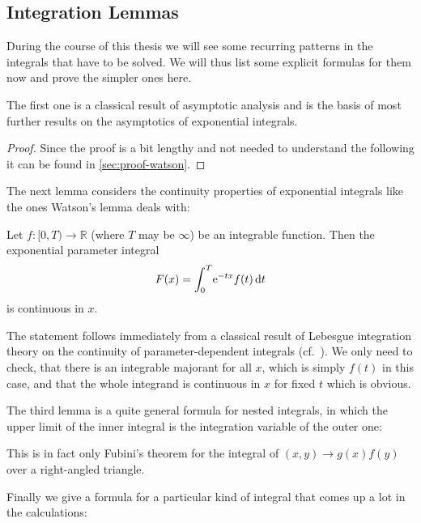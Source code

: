 \subsection{Integration Lemmas}
During the course of this thesis we will see some recurring patterns in the
integrals that have to be solved. We will thus list some explicit formulas for
them now and prove the simpler ones here.

The first one is a classical result of asymptotic analysis and is the basis of
most further results on the asymptotics of exponential integrals.
\begin{Lemma}
  
  \begin{proof}
    Since the proof is a bit lengthy and not needed to understand the following
    it can be found in \cref{sec:proof-watson}.
  \end{proof}
\end{Lemma}
The next lemma considers the continuity properties of exponential integrals like
the ones Watson's lemma deals with:
\begin{Lemma}
  \label{lem:continuity_of_watson_integrals}
  Let $f\colon [0,T)\to\mathbb{R}$ (where $T$ may be $\infty$) be an integrable
  function. Then the exponential parameter integral
  \begin{equation*}
    F(x) = \Integ[T]{0}{t}{\Eto{-tx} f(t)}
  \end{equation*}
  is continuous in $x$.
  \begin{Proof}
    The statement follows immediately from a classical result of Lebesgue
    integration theory on the continuity of parameter-dependent integrals
    (cf.\ \cite[p282f]{Konigsberger2004}). We only need to check, that there is
    an integrable majorant for all $x$, which is simply $f(t)$ in this case, and
    that the whole integrand is continuous in $x$ for fixed $t$ which is
    obvious.
  \end{Proof}
\end{Lemma}
The third lemma is a quite general formula for nested integrals, in which the
upper limit of the inner integral is the integration variable of the outer one:

\begin{Remark}
  This is in fact only Fubini's theorem for the integral of $(x,y)\to g(x)f(y)$
  over a right-angled triangle.
\end{Remark}
Finally we give a formula for a particular kind of integral that comes up a lot
in the calculations:
